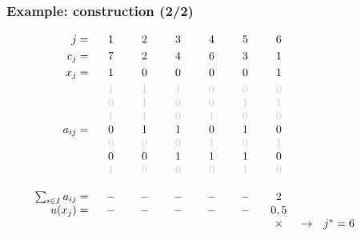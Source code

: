 \documentclass[]{beamer}
\newcommand{\grisc}[1]{\color{black!20}#1}
\begin{document}
\begin{frame}
  \frametitle{Example: construction (2/2)}
\vspace{3mm}

{\small

$
\begin{array}{r cccccccl}
%
j =   & 1 & 2 & 3 & 4 & 5 & 6 \vspace{1mm}\\
c_j =   & 7 & 2 & 4 &  6 & 3 & 1 \vspace{1mm}\\	
x_j =   & 1 & 0 & 0 & 0 & 0 & 1 \vspace{1mm}\\	
  & {\grisc 1} & {\grisc 1} & {\grisc 1} &  {\grisc 0} & {\grisc 0} & {\grisc 0}  \\
  & {\grisc 0} & {\grisc 1} & {\grisc 0} &  {\grisc 0} & {\grisc 1} & {\grisc 1}  \\  
  & {\grisc 1} & {\grisc 1} & {\grisc 0} &  {\grisc 1} & {\grisc 0} & {\grisc 0}  \\ 
a_{ij} =  & { 0} & { 1} & { 1} &  { 0} & { 1} & { 0}  \\ 
  & {\grisc 0} & {\grisc 0} & {\grisc 0} &  {\grisc 1} & {\grisc 0} & {\grisc 1}  \\ 
  & 0 & 0 & 1 &  1 & 1 & 0  \\       
  &  {\grisc 1}  & {\grisc 0} & {\grisc 0} &   {\grisc 0}  & {\grisc 1} & {\grisc 0}  \\
  \\
\qquad \sum_{i\in I} a_{ij} = &	- &	- &	- &	- &	- &	2 \\	
u(x_j) = &	- & - &  - & - &  - & 0,5 \\	
               &  &  &  &  &  &  \times &  \rightarrow & j^{*} =   6 \vspace{1mm} \\  
\quad & \qquad & \qquad & \qquad & \qquad & \qquad & \qquad & \\
\\ %
\end{array}
$ 
}
 

\end{frame}





% 
%
\end{document}
